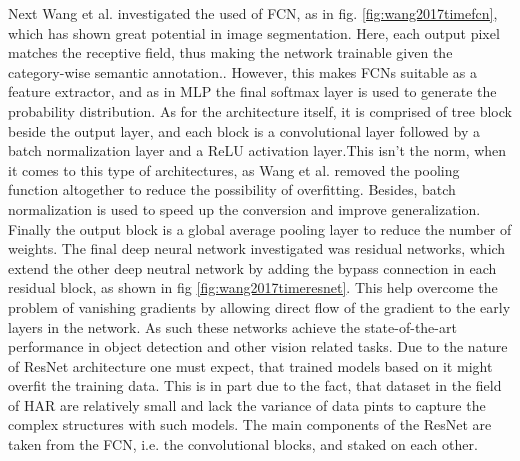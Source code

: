 Next Wang et al. investigated the used of FCN, as in fig. \ref{fig:wang2017timefcn}, which has shown great potential in image segmentation. Here, each output pixel matches the receptive field, thus making the network trainable given the category-wise semantic annotation.\cite{wang2017time}. However, this makes FCNs suitable as a feature extractor, and as in MLP the final softmax layer is used to generate the probability distribution. As for the architecture itself, it is comprised of tree block beside the output layer, and each block is a convolutional layer followed by a batch normalization layer and a ReLU activation layer.This isn't the norm, when it comes to this type of architectures, as Wang et al. removed the pooling function altogether to reduce the possibility of overfitting. Besides, batch normalization is used to speed up the conversion and improve generalization. Finally the output block is a global average pooling layer to reduce the number of weights\cite{wang2017time}.\newline
The final deep neural network investigated was residual networks, which extend the other deep neutral network by adding the bypass connection in each residual block, as shown in fig \ref{fig:wang2017timeresnet}. This help overcome the problem of vanishing gradients by allowing direct flow of the gradient to the early layers in the network. As such these networks achieve the state-of-the-art performance in object detection and other vision related tasks. Due to the nature of ResNet architecture one must expect, that trained models based on it might overfit the training data. This is in part due to the fact, that dataset in the field of HAR are relatively small and lack the variance of data pints to capture the complex structures with such models. The main components of the ResNet are taken from the FCN, i.e. the convolutional blocks, and staked on each other\cite{wang2017time}.
